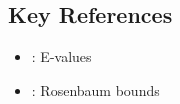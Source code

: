 \subsection{Key References}

\begin{itemize}
    \item \cite{vanderweele2017sensitivity}: E-values
    \item \cite{rosenbaum2002observational}: Rosenbaum bounds
\end{itemize}

